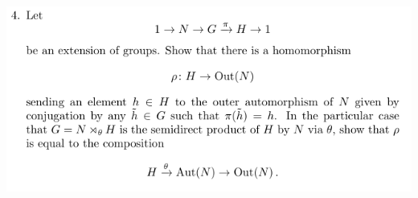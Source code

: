 \documentclass[12pt,letterpaper,boxed]{hmcpset}
\begin{document}
\begin{problem}[3]
	\hfill
\end{problem}
\begin{solution}
\end{solution}

\newpage


\begin{problem}
	\includegraphics[scale=0.8]{4.png}
	\hfill
\end{problem}
\end{document}

